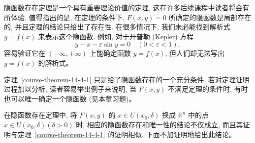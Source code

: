 \documentclass[12pt,fontset=fandol]{ctexart}
\begin{document}
\noindent{}\quad 隐函数存在定理是一个具有重要理论价值的定理, 这在许多后续课程中读者将会有所体验. 值得指出的是, 在定理的条件下, $F(x,y)=0$ 所确定的隐函数是局部存在的, 并且定理的结论只给出了存在性. 在很多情况下, 我们未必能找到解析式 $y=f(x)$ 来表示这个隐函数. 例如, 对于开普勒 (Kepler) 方程
\[
  y-x-\varepsilon\sin y=0\quad(0<\varepsilon<1),
\]
容易验证它在 $(-\infty,+\infty)$ 上能确定函数 $y=f(x)$, 但人们却无法写出 $y=f(x)$ 的解析式。

\noindent{}\quad 定理~\ref{course-theorem-14-4-1}  只是给了隐函数存在的一个充分条件, 若对定理证明过程加以分析, 读者容易举出例子来说明, 当 $F(x,y)$ 不满足定理的条件时, 有时也可以唯一确定一个隐函数 (见本章习题)。

在隐函数存在定理中, 将 $F(x,y)$ 的 $x\in U(x_0,\delta)$ 换成 $\mathbb R^n$ 中的点 $x\in U(x_0,\delta)(\delta>0)$ 时, 相应的隐函数存在和唯一性的结论不仅成立, 而且其证明与定理~\ref{course-theorem-14-4-1}  的证明相似. 下面不加证明地给出此结论。
\end{document}
